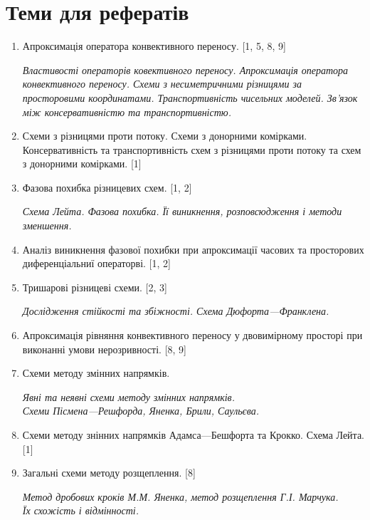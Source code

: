 \section{Теми для рефератів}
\begin{enumerate}
    \item Апроксимація оператора конвективного переносу. [1, 5, 8, 9] \medskip 
    
    \textit{Властивості операторів ковективного переносу. Апроксимація оператора конвективного переносу. Схеми з несиметричними різницями за просторовими координатами. Транспортивність чисельних моделей. Зв'язок між консервативністю та транспортивністю.}
    
    \item Схеми з різницями проти потоку. Схеми з донорними комірками. Консервативність та транспортивність схем з різницями проти потоку та схем з донорними комірками. [1]
    
    \item Фазова похибка різницевих схем.  [1, 2] \medskip 
    
    \textit{Схема Лейта. Фазова похибка. Її виникнення, розповсюдження і методи зменшення.}
    
    \item Аналіз виникнення фазової похибки при апроксимації часових та просторових диференціальниї операторві. [1, 2]
    
    \item Тришарові різницеві схеми. [2, 3] \medskip 
    
    \textit{Дослідження стійкості та збіжності. Схема Дюфорта---Франклена.}
    
    \item Апроксимація рівняння конвективного переносу у двовимірному просторі при виконанні умови нерозривності. [8, 9]
    
    \item Схеми методу змінних напрямків.  \medskip 
    
    \textit{Явні та неявні схеми методу змінних напрямків. \\ Схеми Пісмена---Решфорда, Яненка, Брили, Саульєва.}

    \item Схеми методу знінних напрямків Адамса---Бешфорта та Крокко. Схема Лейта. [1]

    \item Загальні схеми методу розщеплення. [8] \medskip 
    
    \textit{Метод дробових кроків М.М. Яненка, метод розщеплення Г.І. Марчука. \\ Їх схожість і відмінності.}


\end{enumerate}

